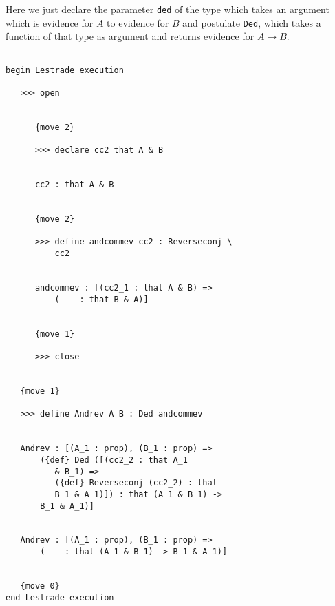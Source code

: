 \documentclass[12pt]{article}
\begin{document}
Here we just declare the parameter {\tt ded} of the type which takes an argument which is evidence for $A$ to evidence for $B$ and postulate {\tt Ded}, which takes a function of that type as argument and returns evidence for $A \rightarrow B$.

\begin{verbatim}

begin Lestrade execution

   >>> open


      {move 2}

      >>> declare cc2 that A & B


      cc2 : that A & B


      {move 2}

      >>> define andcommev cc2 : Reverseconj \
          cc2


      andcommev : [(cc2_1 : that A & B) => 
          (--- : that B & A)]


      {move 1}

      >>> close


   {move 1}

   >>> define Andrev A B : Ded andcommev


   Andrev : [(A_1 : prop), (B_1 : prop) => 
       ({def} Ded ([(cc2_2 : that A_1 
          & B_1) => 
          ({def} Reverseconj (cc2_2) : that 
          B_1 & A_1)]) : that (A_1 & B_1) -> 
       B_1 & A_1)]


   Andrev : [(A_1 : prop), (B_1 : prop) => 
       (--- : that (A_1 & B_1) -> B_1 & A_1)]


   {move 0}
end Lestrade execution

\end{verbatim}
\end{document}

